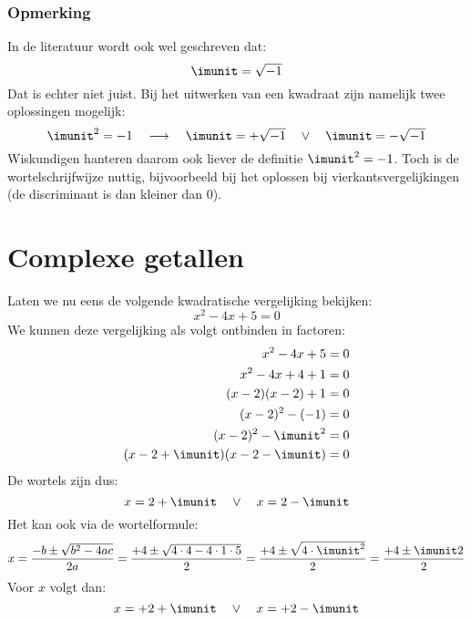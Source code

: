 \subsubsection*{Opmerking}
In de literatuur wordt ook wel geschreven dat:
%
\begin{equation}
\imunit = \sqrt{-1}
\end{equation}
%
Dat is echter niet juist. Bij het uitwerken van een kwadraat zijn namelijk twee oplossingen mogelijk:
%
\begin{equation}
\imunit^2 = -1 \quad \longrightarrow \quad \imunit = +\sqrt{-1} \quad\vee\quad \imunit = -\sqrt{-1}
\end{equation}
%
Wiskundigen hanteren daarom ook liever de definitie $\imunit^2=-1$. Toch is de wortelschrijfwijze nuttig, bijvoorbeeld bij het oplossen bij vierkantsvergelijkingen (de discriminant is dan kleiner dan 0).

\section{Complexe getallen}
Laten we nu eens de volgende kwadratische vergelijking bekijken:
%
\begin{equation}
x^2 - 4x + 5 = 0
\end{equation}
%
We kunnen deze vergelijking als volgt ontbinden in factoren:
%
\begin{equation}
\begin{split}
x^2 - 4x + 5 = 0 \\
x^2 - 4x + 4 + 1 = 0 \\
(x-2)(x-2) + 1 = 0 \\
(x-2)^2 - (-1) = 0 \\
(x-2)^2  - \imunit^2 = 0 \\
(x-2+\imunit)(x-2-\imunit) = 0 \\
\end{split}
\end{equation}
%
De wortels zijn dus:
%
\begin{equation}
x=2+\imunit \quad\vee\quad x=2-\imunit
\end{equation}
%
Het kan ook via de wortelformule:
%
\begin{equation}
x = \dfrac{-b\pm\sqrt{b^2-4ac}}{2a} = \dfrac{+4\pm\sqrt{4\cdot4-4\cdot1\cdot5}}{2} = \dfrac{+4\pm\sqrt{4\cdot\imunit^2}}{2} = \dfrac{+4\pm\imunit2}{2} \\
\end{equation}
%
Voor $x$ volgt dan:
%
\begin{equation}
x = +2+\imunit \quad\vee\quad x = +2-\imunit
\end{equation}

